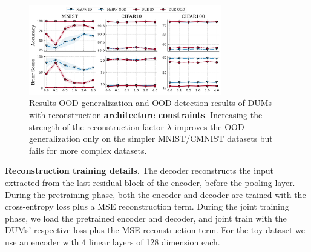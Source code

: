 \begin{figure}[!htb]
    \centering
    \includegraphics[width=0.75\textwidth]{sections/008_iclr2023/figures/reconst.pdf}
    \caption{Results OOD generalization and OOD detection results of DUMs with reconstruction \textbf{architecture constraints}. Increasing the strength of the reconstruction factor $\lambda$ improves the OOD generalization only on the simpler MNIST/CMNIST datasets but fails for more complex datasets. }
    \label{fig:reconst_full}
\end{figure}

\textbf{Reconstruction training details.} The decoder reconstructs the input extracted from the last residual block of the encoder, before the pooling layer. During the pretraining phase, both the encoder and decoder are trained with the cross-entropy loss plus a MSE reconstruction term. During the joint training phase, we load the pretrained encoder and decoder, and joint train with the DUMs' respective loss plus the MSE reconstruction term. For the toy dataset we use an encoder with 4 linear layers of 128 dimension each.


